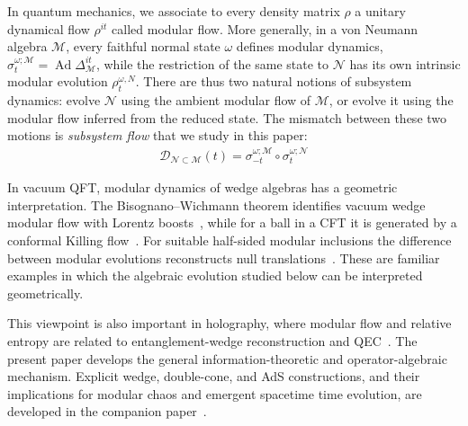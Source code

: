 \documentclass[a4paper,11pt]{article}
\theoremstyle{definition}
\newcommand{\mN}{\mathcal{N}}
\newcommand{\mM}{\mathcal{M}}
\begin{document}
In quantum mechanics, we associate to every density matrix $\rho$ a unitary dynamical flow $\rho^{it}$ called modular flow. More generally, in a von Neumann algebra $\mM$, every faithful normal state $\omega$ defines modular dynamics, $
    \sigma_t^{\omega;\mM}
    =
    \operatorname{Ad}\Delta_{\mM}^{it}$,
while the restriction of the same state to $\mN$ has its own intrinsic modular evolution $\rho_t^{\omega,N}$. There are thus two natural notions of subsystem dynamics: evolve $\mN$ using the ambient modular flow of $\mM$, or evolve it using the modular flow inferred from the reduced state.  The mismatch between these two motions is \emph{subsystem flow} that we study in this paper: 
\begin{align}
    \mathcal{D}_{\mN\subset\mM}(t)=\sigma_{-t}^{\omega;\mM}\circ \sigma_{t}^{\omega;\mN}
\end{align}

In vacuum QFT, modular dynamics of wedge algebras has a geometric interpretation. The Bisognano--Wichmann theorem identifies vacuum wedge modular flow with Lorentz boosts~\cite{BisognanoWichmann1975}, while for a ball in a CFT it is generated by a conformal Killing flow~\cite{CasiniHuertaMyers2011}. For suitable half-sided modular inclusions the difference between modular evolutions reconstructs null translations~\cite{Wiesbrock1993,Borchers1992}. These are familiar examples in which the algebraic evolution studied below can be interpreted geometrically.

This viewpoint is also important in holography, where modular flow and relative entropy are related to entanglement-wedge reconstruction and QEC~\cite{AlmheiriDongHarlow2015,JafferisLewkowyczMaldacenaSuh2016}. The present paper develops the general information-theoretic and operator-algebraic mechanism. Explicit wedge, double-cone, and AdS constructions, and their implications for modular chaos and emergent spacetime time evolution, are developed in the companion paper~\cite{companionQFT}.
\end{document}
